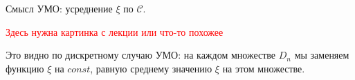 \begin{note}
    Смысл УМО: усреднение $\xi$ по $\mathcal{C}$.

    \textcolor{red}{Здесь нужна картинка с лекции или что-то похожее}

    Это видно по дискретному случаю УМО: на каждом множестве $D_n$ мы заменяем функцию $\xi$ на $const$, равную среднему значению $\xi$ на этом множестве.
\end{note}